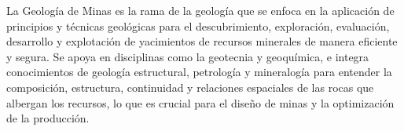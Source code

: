 
La Geología de Minas es la rama de la geología que se enfoca en la aplicación de principios y técnicas geológicas para el descubrimiento, exploración, evaluación, desarrollo y explotación de yacimientos de recursos minerales de manera eficiente y segura. Se apoya en disciplinas como la geotecnia y geoquímica, e integra conocimientos de geología estructural, petrología y mineralogía para entender la composición, estructura, continuidad y relaciones espaciales de las rocas que albergan los recursos, lo que es crucial para el diseño de minas y la optimización de la producción. 